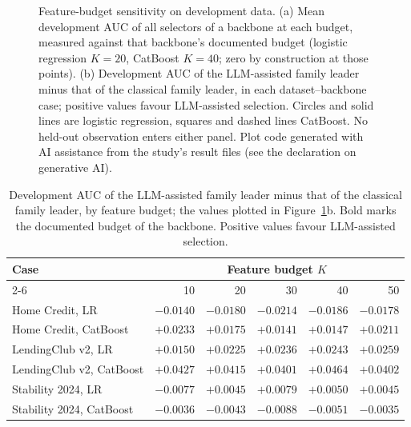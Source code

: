 \documentclass[final,5p,twocolumn]{elsarticle}
\newcommand{\Kfeat}{K}
\begin{document}
\begin{figure}[htbp]
\caption{Feature-budget sensitivity on development data. (a) Mean development AUC of all selectors of a backbone at each budget, measured against that backbone's documented budget (logistic regression $\Kfeat=20$, CatBoost $\Kfeat=40$; zero by construction at those points). (b) Development AUC of the LLM-assisted family leader minus that of the classical family leader, in each dataset--backbone case; positive values favour LLM-assisted selection. Circles and solid lines are logistic regression, squares and dashed lines CatBoost. No held-out observation enters either panel. Plot code generated with AI assistance from the study's result files (see the declaration on generative AI).}
\label{fig:budgets}
\end{figure}

\begin{table}[htbp]
\centering
\footnotesize
\begin{threeparttable}
\caption{Development AUC of the LLM-assisted family leader minus that of the classical family leader, by feature budget; the values plotted in Figure~\ref{fig:budgets}b. Bold marks the documented budget of the backbone. Positive values favour LLM-assisted selection.}
\label{tab:budgets}
\setlength{\tabcolsep}{4pt}
\begin{tabular}{@{}lrrrrr@{}}
\toprule
Case & \multicolumn{5}{c}{Feature budget $\Kfeat$} \\
\cmidrule(l){2-6}
 & 10 & 20 & 30 & 40 & 50 \\
\midrule
Home Credit, LR & $-0.0140$ & $\mathbf{-0.0180}$ & $-0.0214$ & $-0.0186$ & $-0.0178$ \\
Home Credit, CatBoost & $+0.0233$ & $+0.0175$ & $+0.0141$ & $\mathbf{+0.0147}$ & $+0.0211$ \\
LendingClub v2, LR & $+0.0150$ & $\mathbf{+0.0225}$ & $+0.0236$ & $+0.0243$ & $+0.0259$ \\
LendingClub v2, CatBoost & $+0.0427$ & $+0.0415$ & $+0.0401$ & $\mathbf{+0.0464}$ & $+0.0402$ \\
Stability 2024, LR & $-0.0077$ & $\mathbf{+0.0045}$ & $+0.0079$ & $+0.0050$ & $+0.0045$ \\
Stability 2024, CatBoost & $-0.0036$ & $-0.0043$ & $-0.0088$ & $\mathbf{-0.0051}$ & $-0.0035$ \\
\bottomrule
\end{tabular}
\end{threeparttable}
\end{table}
\end{document}
